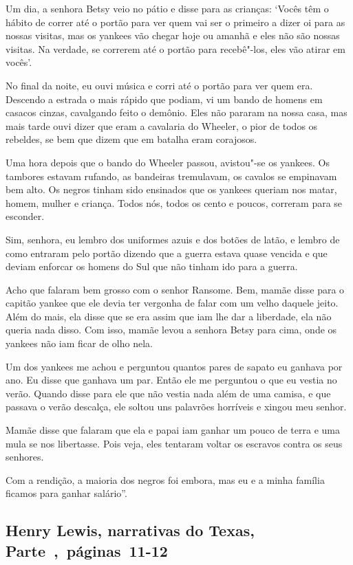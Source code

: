 Um dia, a senhora Betsy veio no pátio e disse para as crianças: `Vocês
têm o hábito de correr até o portão para ver quem vai ser o primeiro a
dizer oi para as nossas visitas, mas os yankees vão chegar hoje ou
amanhã e eles não são nossas visitas. Na verdade, se correrem até o
portão para recebê"-los, eles vão atirar em vocês'.

No final da noite, eu ouvi música e corri até o portão para ver quem
era. Descendo a estrada o mais rápido que podiam, vi um bando de homens
em casacos cinzas, cavalgando feito o demônio. Eles não pararam na nossa
casa, mas mais tarde ouvi dizer que eram a cavalaria do Wheeler, o pior
de todos os rebeldes, se bem que dizem que em batalha eram corajosos.

Uma hora depois que o bando do Wheeler passou, avistou"-se os yankees. Os
tambores estavam rufando, as bandeiras tremulavam, os cavalos se
empinavam bem alto. Os negros tinham sido ensinados que os yankees
queriam nos matar, homem, mulher e criança. Todos nós, todos os cento e
poucos, correram para se esconder.

Sim, senhora, eu lembro dos uniformes azuis e dos botões de latão, e
lembro de como entraram pelo portão dizendo que a guerra estava quase
vencida e que deviam enforcar os homens do Sul que não tinham ido para a
guerra.

Acho que falaram bem grosso com o senhor Ransome. Bem, mamãe disse para
o capitão yankee que ele devia ter vergonha de falar com um velho
daquele jeito. Além do mais, ela disse que se era assim que iam lhe dar
a liberdade, ela não queria nada disso. Com isso, mamãe levou a senhora
Betsy para cima, onde os yankees não iam ficar de olho nela.

Um dos yankees me achou e perguntou quantos pares de sapato eu ganhava
por ano. Eu disse que ganhava um par. Então ele me perguntou o que eu
vestia no verão. Quando disse para ele que não vestia nada além de uma
camisa, e que passava o verão descalça, ele soltou uns palavrões
horríveis e xingou meu senhor.

Mamãe disse que falaram que ela e papai iam ganhar um pouco de terra e
uma mula se nos libertasse. Pois veja, eles tentaram voltar os escravos
contra os seus senhores.

Com a rendição, a maioria dos negros foi embora, mas eu e a minha
família ficamos para ganhar salário''.

\subsection{Henry Lewis, narrativas do Texas, Parte~,~páginas~11-12}
\label{ref177}

